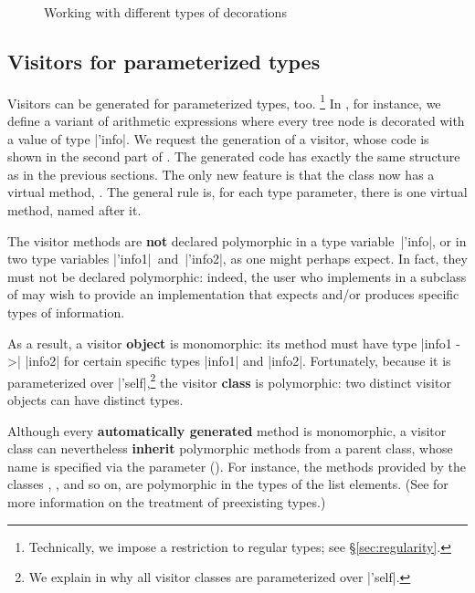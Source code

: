 \documentclass[11pt,a4paper,twoside]{article}
\renewcommand{\emph}[1]{\textbf{#1}}
\begin{document}
\begin{figure}[p]
\caption{Working with different types of decorations}
\label{fig:expr10}
\end{figure}

\subsection{Visitors for parameterized types}
\label{sec:intro:parameterized}

Visitors can be generated for parameterized types, too.%
%
\footnote{Technically, we impose a restriction to regular types; see
  \S\ref{sec:regularity}.}
%
In , for instance, we define a variant of arithmetic
expressions where every tree node is decorated with a value of type
\oc|'info|. We request the generation of a \map visitor, whose code is shown
in the second part of . The generated code has exactly the
same structure as in the previous sections. The only new feature is that the
class \map now has a virtual method, . The general rule
is, for each type parameter, there is one virtual method, named after it.

The visitor methods are \emph{not} declared polymorphic in a type
variable~\oc|'info|, or in two type variables \oc|'info1|~and~\oc|'info2|, as
one might perhaps expect. In fact, they must not be declared polymorphic:
indeed, the user who implements  in a subclass of \map may
wish to provide an implementation that expects and/or produces specific types
of information.

As a result, a visitor \emph{object} is monomorphic: its method
 must have type \oc|info1 ->| \oc|info2| for certain
specific types \oc|info1| and \oc|info2|. Fortunately, because it is
parameterized over \oc|'self|,\footnote{We explain in  why
  all visitor classes are parameterized over \oc|'self|.} the visitor
\emph{class} is polymorphic: two distinct visitor objects can have distinct
types.

Although every \emph{automatically generated} method
is monomorphic, a visitor class can nevertheless \emph{inherit} polymorphic
methods from a parent class, whose name is specified via the \ancestors parameter
(). For instance, the  methods provided by
the classes , , and so on, are
polymorphic in the types of the list elements. (See 
for more information on the treatment of preexisting types.)
\end{document}
